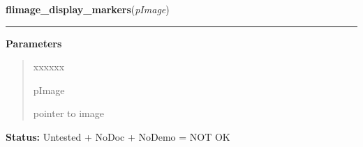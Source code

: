 \hspace{.8\funcindent}\begin{boxedminipage}{\funcwidth}

    \raggedright \textbf{flimage\_display\_markers}(\textit{pImage})

    \vspace{-1.5ex}

    \rule{\textwidth}{0.5\fboxrule}
\setlength{\parskip}{2ex}
\setlength{\parskip}{1ex}
      \textbf{Parameters}
      \vspace{-1ex}

      \begin{quote}
        \begin{Ventry}{xxxxxx}

          \item[pImage]

          pointer to image

        \end{Ventry}

      \end{quote}

\textbf{Status:} Untested + NoDoc + NoDemo = NOT OK



    \end{boxedminipage}

    \label{xformslib:flflimage:flimage_dup_}

    \vspace{0.5ex}

